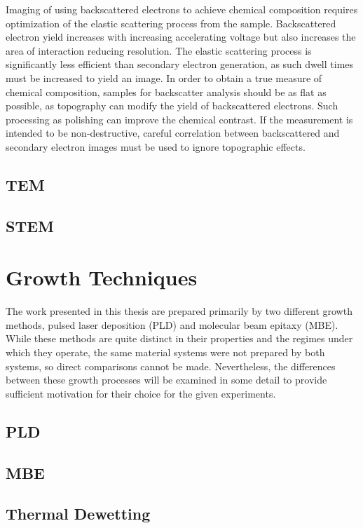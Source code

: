Imaging of using backscattered electrons to achieve chemical composition requires optimization of the elastic scattering process from the sample. Backscattered electron yield increases with increasing accelerating voltage but also increases the area of interaction reducing resolution. The elastic scattering process is significantly less efficient than secondary electron generation, as such dwell times must be increased to yield an image. In order to obtain a true measure of chemical composition, samples for backscatter analysis should be as flat as possible, as topography can modify the yield of backscattered electrons. Such processing as polishing can improve the chemical contrast. If the measurement is intended to be non-destructive, careful correlation between backscattered and secondary electron images must be used to ignore topographic effects.
\subsection{TEM}

\subsection{STEM}


\section{Growth Techniques}
The work presented in this thesis are prepared primarily by two different growth methods, pulsed laser deposition (PLD) and molecular beam epitaxy (MBE). While these methods are quite distinct in their properties and the regimes under which they operate, the same material systems were not prepared by both systems, so direct comparisons cannot be made. Nevertheless, the differences between these growth processes will be examined in some detail to provide sufficient motivation for their choice for the given experiments.
\subsection{PLD}
\subsection{MBE}
\subsection{Thermal Dewetting}